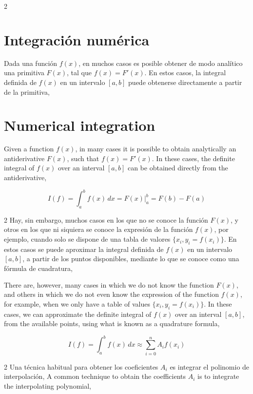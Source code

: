\begin{paracol}{2}
\section{Integración numérica}\label{sec:inum}

Dada una función $f(x)$, en muchos casos es posible obtener de modo analítico una primitiva $F(x)$, tal que $f(x)=F'(x)$. En estos casos, la integral definida de $f(x)$ en un intervalo $[a,b]$ puede obtenerse directamente a partir de la primitiva,

\switchcolumn
\section{Numerical integration}\label{sec:inum-2}
Given a function $f(x)$, in many cases it is possible to obtain analytically an antiderivative $F(x)$, such that $f(x)=F'(x)$. In these cases, the definite integral of $f(x)$ over an interval $[a,b]$ can be obtained directly from the antiderivative,
\end{paracol}
\begin{equation*}
I(f)=\int_a^bf(x)\,dx=F(x)\Big\vert_a^b=F(b)-F(a)
\end{equation*}
\begin{paracol}{2}
Hay, sin embargo, muchos casos en los que no se conoce la función $F(x)$, y otros en los que ni siquiera se conoce la expresión de la función $f(x)$, por ejemplo, cuando solo se dispone de una tabla de valores $\{ x_i,y_i=f(x_i) \}$. En estos casos se puede aproximar la integral definida de $f(x)$ en un intervalo $[a,b]$, a partir de los puntos disponibles, mediante lo que se conoce como una fórmula de cuadratura,

\switchcolumn
There are, however, many cases in which we do not know the function $F(x)$, and others in which we do not even know the expression of the function $f(x)$, for example, when we only have a table of values $\{x_i,y_i = f(x_i)\}$. In these cases, we can approximate the definite integral of $f(x)$ over an interval $[a,b]$, from the available points, using what is known as a quadrature formula,
\end{paracol}
\begin{equation*}
I(f)=\int_a^bf(x)\,dx \approx \sum_{i=0}^nA_if(x_i)
\end{equation*}
\begin{paracol}{2}
Una técnica habitual para obtener los coeficientes $A_i$ es integrar el polinomio de interpolación,
\switchcolumn
A common technique to obtain the coefficients $A_i$ is to integrate the interpolating polynomial,
\end{paracol}
